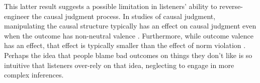 \documentclass[fleqn,reqno,10pt]{article}
\begin{document}
This latter result suggests a possible limitation in listeners' ability to reverse-engineer the causal judgment process. In studies of causal judgment, manipulating the causal structure typically has an effect on causal judgment even when the outcome has non-neutral valence \citep{kominsky2015causal, icard2017normality}. Furthermore, while outcome valence has an effect, that effect is typically smaller than the effect of norm violation \citep{alicke2011causation, kominsky2015causal, icard2017normality}. Perhaps the idea that people blame bad outcomes on things they don't like is so intuitive that listeners over-rely on that idea, neglecting to engage in more complex inferences.

\printbibliography[heading=bibintoc]
\end{document}
